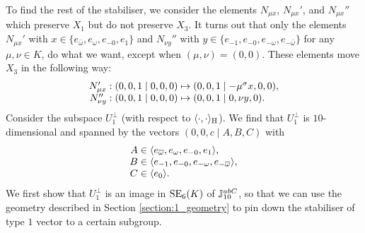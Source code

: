 To find the rest of the stabiliser, we consider the elements $N_{\mu x}$, $N_{\mu x}'$, and
$N_{\mu x}''$ which preserve $X_1$ but do not preserve $X_3$. It turns out that only the elements
$N_{\mu x}'$ with $x \in \{e_{\bar{\omega}}, e_{\omega}, e_{-0}, e_1\}$ and 
$N_{\nu y}''$ with $y \in \{ e_{-1}, e_{-0}, e_{-\omega}, e_{-\bar{\omega}} \}$ for any 
$\mu,\nu \in K$,
do what we want, except when $(\mu,\nu) = (0,0)$. These elements move $X_3$ in the following way:
\begin{equation}
	\begin{array}{r@{\;}c@{\;}l}
		N_{\mu x}': (0,0,1\mid 0,0,0) & \mapsto & (0,0,1\mid -\mu^{\s} x, 0, 0), \\
		N_{\nu y}'': (0,0,1\mid 0,0,0) & \mapsto & (0,0,1\mid 0, \nu y, 0).  
	\end{array}
\end{equation}
Consider the subspace $U_1^{\perp}$ (with respect to $\langle \cdot, \cdot \rangle_{\mathrm{H}}$). We find that
$U_1^{\perp}$ is $10$-dimensional and spanned by the vectors $(0,0,c\mid A,B,C)$ with
\begin{equation}
	\begin{array}{r@{\;}c@{\;}l}
		A & \in & \langle e_{\bar{\omega}}, e_{\omega}, e_{-0}, e_1 \rangle, \\
		B & \in & \langle e_{-1}, e_{-0}, e_{-\omega}, e_{-\bar{\omega}} \rangle, \\
		C & \in & \langle e_0 \rangle.
	\end{array}
\end{equation}
We first show that $U_1^{\perp}$ is an image in $\mathrm{SE}_6(K)$
of $\mathbb{J}_{10}^{abC}$, so that we can use the geometry 
described in Section \ref{section:1_geometry} to pin down
the stabiliser of type $1$ vector to a certain subgroup.

